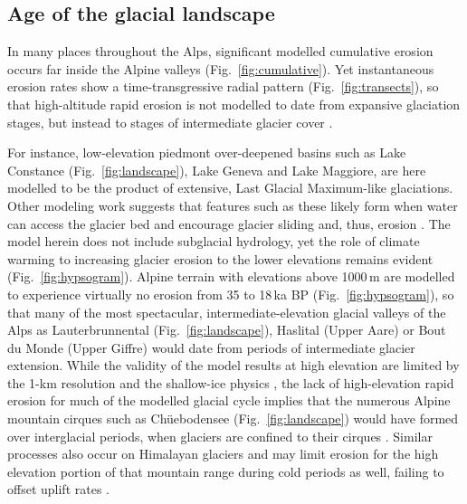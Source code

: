 \documentclass[esurf, manuscript]{copernicus}
\begin{document}
\subsection{Age of the glacial landscape}

    In many places throughout the Alps, significant modelled cumulative erosion
    occurs far inside the Alpine valleys (Fig.~\ref{fig:cumulative}). Yet
    instantaneous erosion rates show a time-transgressive radial pattern
    (Fig.~\ref{fig:transects}), so that high-altitude rapid erosion is not
    modelled to date from expansive glaciation stages, but instead to stages of
    intermediate glacier cover
    \citep[Fig.~\ref{fig:hypsogram};][]{Barr.etal.2019}.

    For instance, low-elevation piedmont over-deepened basins such as Lake
    Constance (Fig.~\ref{fig:landscape}), Lake Geneva and Lake Maggiore, are
    here modelled to be the product of extensive, Last Glacial Maximum-like
    glaciations. Other modeling work suggests that features such as these
    likely form when water can access the glacier bed and encourage glacier
    sliding and, thus, erosion \citep{Herman.etal.2011}. The model herein does
    not include subglacial hydrology, yet the role of climate warming to
    increasing glacier erosion to the lower elevations remains evident
    (Fig.~\ref{fig:hypsogram}).
    Alpine terrain with elevations above 1000\,m are modelled to
    experience virtually no erosion from 35 to 18\,ka BP
    (Fig.~\ref{fig:hypsogram}), so that many of the most spectacular,
    intermediate-elevation glacial valleys of the Alps as Lauterbrunnental
    (Fig.~\ref{fig:landscape}), Haslital (Upper Aare) or Bout du Monde (Upper
    Giffre) would date from periods of intermediate glacier extension.
    While the validity of the model results at high elevation are
    limited by the 1-km resolution and the shallow-ice physics
    \citep{Imhof.etal.2019}, the lack of high-elevation rapid erosion for much
    of the modelled glacial cycle implies that the numerous Alpine mountain
    cirques such as Ch\"uebodensee (Fig.~\ref{fig:landscape}) would have formed
    over interglacial periods, when glaciers are confined to their cirques
    \citep{Barr.etal.2017, Barr.etal.2019}. Similar processes also occur on
    Himalayan glaciers and may limit erosion for the high elevation portion of
    that mountain range during cold periods as well, failing to offset uplift
    rates \citep{Harper.Humphrey.2003}.
\end{document}
